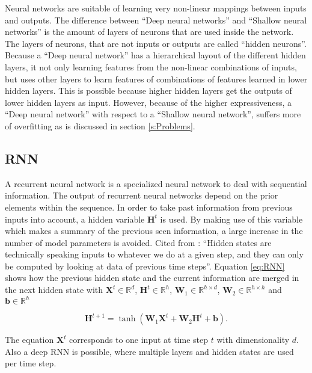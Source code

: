 Neural networks are suitable of learning very non-linear mappings between inputs and outputs. The difference between ``Deep neural networks'' and ``Shallow neural networks'' is the amount of layers of neurons that are used inside the network. The layers of neurons, that are not inputs or outputs are called ``hidden neurons''. Because a ``Deep neural network'' has a hierarchical layout of the different hidden layers, it not only learning features from the non-linear combinations of inputs, but uses other layers to learn features of combinations of features learned in lower hidden layers. This is possible because higher hidden layers get the outputs of lower hidden layers as input. However, because of the higher expressiveness, a ``Deep neural network'' with respect to a ``Shallow neural network'', suffers more of overfitting as is discussed in section \ref{s:Problems}.


\subsection{RNN}\label{s:RNN}
A recurrent neural network is a specialized neural network to deal with sequential information. The output of recurrent neural networks depend on the prior elements within the sequence. In order to take past information from previous inputs into account, a hidden variable $ \bm{H}^t $ is used. By making use of this variable which makes a summary of the previous seen information, a large increase in the number of model parameters is avoided. Cited from \cite{bibid}: ``Hidden states are technically speaking inputs to whatever we do at a given step, and they can only be computed by looking at data of previous time steps''. Equation \ref{eq:RNN} shows how the previous hidden state and the current information are merged in the next hidden state with $ \textbf{X}^t\in \mathbb{R}^{d} $, $ \textbf{H}^t\in \mathbb{R}^{h} $, $ \textbf{W}_1\in \mathbb{R}^{h\times d} $, $\textbf{W}_2\in \mathbb{R}^{h\times h} $ and $ \textbf{b}\in \mathbb{R}^{h} $ 

\begin{equation}\label{eq:RNN}
	\textbf{H}^{t+1} = \tanh(\textbf{W}_1\textbf{X}^{t}+\textbf{W}_2\textbf{H}^{t}+\textbf{b}).
\end{equation}

The equation $\textbf{X}^t$ corresponds to one input at time step $ t $ with dimensionality $ d $. 
Also a deep RNN is possible, where multiple layers and hidden states are used per time step. \\

